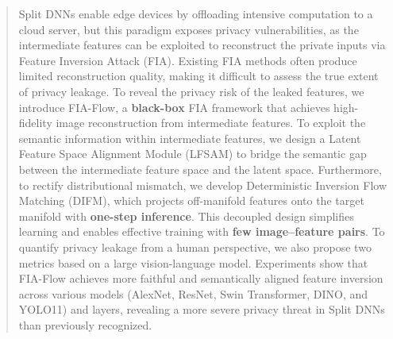 \begin{abstract}
Split DNNs enable edge devices by offloading intensive computation to a cloud server, but this paradigm exposes privacy vulnerabilities, as the intermediate features can be exploited to reconstruct the private inputs via Feature Inversion Attack (FIA).
Existing FIA methods often produce limited reconstruction quality, making it difficult to assess the true extent of privacy leakage.
To reveal the privacy risk of the leaked features, we introduce FIA-Flow, a \textbf{black-box} FIA framework that achieves high-fidelity image reconstruction from intermediate features. 
To exploit the semantic information within intermediate features, we design a Latent Feature Space Alignment Module (LFSAM) to bridge the semantic gap between the intermediate feature space and the latent space.
Furthermore, to rectify distributional mismatch, we develop Deterministic Inversion Flow Matching (DIFM), which projects off-manifold features onto the target manifold with \textbf{one-step inference}.
This decoupled design simplifies learning and enables effective training with \textbf{few image–feature pairs}.
To quantify privacy leakage from a human perspective, we also propose two metrics based on a large vision-language model. 
Experiments show that FIA-Flow achieves more faithful and semantically aligned feature inversion across various models (AlexNet, ResNet, Swin Transformer, DINO, and YOLO11) and layers, revealing a more severe privacy threat in Split DNNs than previously recognized.
\end{abstract} 